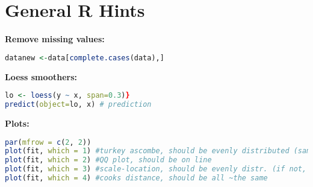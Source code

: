 \section{General R Hints}
\textbf{Remove missing values: }
\begin{lstlisting}[language = R]
datanew <-data[complete.cases(data),]
\end{lstlisting}
\textbf{Loess smoothers: } 
\begin{lstlisting}[language = R]
lo <- loess(y ~ x, span=0.3)}
predict(object=lo, x) # prediction
\end{lstlisting}
\textbf{Plots:}
\begin{lstlisting}[language = R]
par(mfrow = c(2, 2))
plot(fit, which = 1) #turkey ascombe, should be evenly distributed (same amount positive and negative->otherwise not normally distributed, straight lane ->otherwise expected value depends on x, if eg. beginning all dots close to line and end not, it's non constant variance)
plot(fit, which = 2) #QQ plot, should be on line
plot(fit, which = 3) #scale-location, should be evenly distr. (if not, no heteroscedasticity)
plot(fit, which = 4) #cooks distance, should be all ~the same
\end{lstlisting}